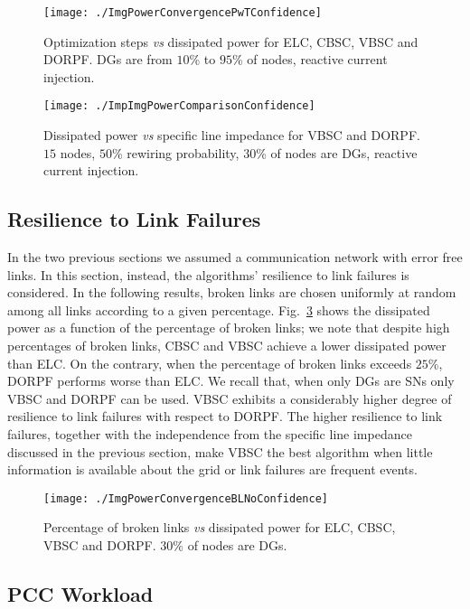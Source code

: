 \documentclass[journal]{IEEEtran}
\newcommand{\fig}[1]{Fig.~\ref{#1}}
\begin{document}
\begin{figure}
\centering
\texttt{[image: ./ImgPowerConvergencePwTConfidence]}
\caption{Optimization steps {\it vs} dissipated power for ELC, CBSC, VBSC and DORPF. DGs are from $10$\% to $95$\% of nodes, reactive current injection.}\label{figure:PwT}
\end{figure}

\begin{figure}
\centering
\texttt{[image: ./ImpImgPowerComparisonConfidence]}
\caption{Dissipated power {\it vs} specific line impedance for VBSC and DORPF. $15$ nodes, $50$\% rewiring probability, $30$\% of nodes are DGs, reactive current injection.\label{figure:IMPCMP}}
\end{figure}



\subsection{Resilience to Link Failures}
\label{ssec:algoResilience}

In the two previous sections we assumed a communication network with error free links. In this section, instead, the algorithms' resilience to link failures is considered. In the following results, broken links are chosen uniformly at random among all links according to a given percentage. \fig{figure:BL} shows the dissipated power as a function of the percentage of broken links; we note that despite high percentages of broken links, CBSC and VBSC achieve a lower dissipated power than ELC. On the contrary, when the percentage of broken links exceeds $25$\%, DORPF performs worse than ELC. We recall that, when only DGs are SNs only VBSC and DORPF can be used. VBSC exhibits a considerably higher degree of resilience to link failures with respect to DORPF. The higher resilience to link failures, together with the independence from the specific line impedance discussed in the previous section, make VBSC the best algorithm when little information is available about the grid or link failures are frequent events. 

\begin{figure}
\centering
\texttt{[image: ./ImgPowerConvergenceBLNoConfidence]}
\caption{Percentage of broken links {\it vs} dissipated power for ELC, CBSC, VBSC and DORPF. $30$\% of nodes are DGs.\label{figure:BL}}
\end{figure}

\subsection{PCC Workload}
\end{document}
